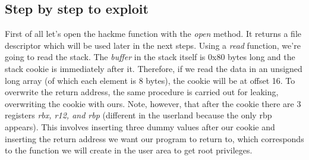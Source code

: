 \documentclass{masterthesis}
\begin{document}
\subsection{Step by step to exploit}
First of all let's open the hackme function with the \emph{open} method. It returns a file descriptor which will be used later in the next steps.
Using a \emph{read} function, we're going to read the stack.
The \emph{buffer} in the stack itself is 0x80 bytes long and the stack cookie is immediately after it. Therefore, if we read the data in an unsigned long array (of which each element is 8 bytes), the cookie will be at offset 16.
To overwrite the return address, the same procedure is carried out for leaking, overwriting the cookie with ours. Note, however, that after the cookie there are 3 registers \emph{rbx, r12, and rbp} (different in the userland because the only rbp appears).
This involves inserting three dummy values after our cookie and inserting the return address we want our program to return to, which corresponds to the function we will create in the user area to get root privileges.
\end{document}
